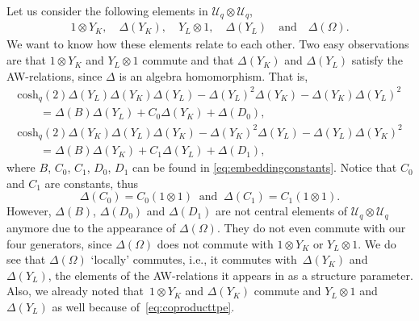 \documentclass[10pt,a4paper]{amsart}
\numberwithin{equation}{section}
\newcommand{\chq}{\mathrm{cosh}_q}
\newcommand{\dyone}{\Delta\left(Y_{L}\right)}
\newcommand{\dyzero}{\Delta\left(Y_{K}\right)}
\newcommand{\Uq}{\mathcal{U}_q}
\newcommand{\yone}{Y_{L}\otimes 1}
\newcommand{\yzero}{1\otimes Y_{K}}
\begin{document}
Let us consider the following elements in $\Uq\otimes\Uq$,
\begin{gather*}
	1\otimes Y_{K},\quad \Delta(Y_{K}),\quad Y_{L}\otimes 1,\quad \Delta(Y_{L})\quad \text{and}\quad \Delta(\Omega).
\end{gather*}
We want to know how these elements relate to each other. Two easy observations are that $1\otimes Y_{K}$ and $Y_{L}\otimes 1$ commute and that $\Delta(Y_{K})$ and $\Delta(Y_{L})$ satisfy the AW-relations, since $\Delta$ is an algebra homomorphism. That is,
\begin{gather*}
\chq(2)\Delta(Y_{L})\Delta(Y_{K})\Delta(Y_{L}) - \Delta(Y_{L})^2\Delta(Y_{K})-\Delta(Y_{K})\Delta(Y_{L})^2 \\
\qquad{}=\Delta(B)\Delta(Y_{L}) + C_0\Delta(Y_{K}) + \Delta(D_0), \\
\chq(2)\Delta(Y_{K})\Delta(Y_{L})\Delta(Y_{K}) - \Delta(Y_{K})^2\Delta(Y_{L})-\Delta(Y_{L})\Delta(Y_{K})^2\\
\qquad{}=\Delta(B)\Delta(Y_{K}) + C_1\Delta(Y_{L}) + \Delta(D_1),
\end{gather*}
where $B$, $C_0$, $C_1$, $D_0$, $D_1$ can be found in \eqref{eq:embeddingconstants}. Notice that $C_0$ and $C_1$ are constants, thus
\[
\Delta(C_0)=C_0 (1\otimes 1)\ \text{ and }\ \Delta(C_1)=C_1 (1\otimes 1).
\]
However, $\Delta(B)$, $\Delta(D_0)$ and $\Delta(D_1)$ are not central elements of $\Uq\otimes \Uq$ anymore due to the appearance of $\Delta(\Omega)$. They do not even commute with our four generators,
since $\Delta(\Omega)$ does not commute with $1\otimes Y_{K}$ or $Y_{L}\otimes 1$. We do see that $\Delta(\Omega)$ `locally' commutes, i.e., it commutes with~$\dyzero$ and~$\dyone$, the elements of the AW-relations it appears in as a structure parameter. Also, we already noted that~$\yzero$ and $\dyzero$ commute and $\yone$ and $\dyone$ as well because of~\eqref{eq:coproducttpe}.
\end{document}
